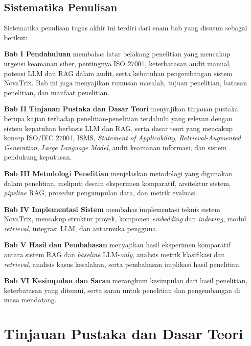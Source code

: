 \documentclass[bachelor,bahasa]{thesisdtetiugm}
\begin{document}
\section{Sistematika Penulisan}
\label{sec:sistematika-penulisan}

Sistematika penulisan tugas akhir ini terdiri dari enam bab yang disusun sebagai berikut:

\textbf{Bab I Pendahuluan} membahas latar belakang penelitian yang mencakup urgensi keamanan siber, pentingnya ISO 27001, keterbatasan audit manual, potensi LLM dan RAG dalam audit, serta kebutuhan pengembangan sistem NovaTrix. Bab ini juga menyajikan rumusan masalah, tujuan penelitian, batasan penelitian, dan manfaat penelitian.

\textbf{Bab II Tinjauan Pustaka dan Dasar Teori} menyajikan tinjauan pustaka berupa kajian terhadap penelitian-penelitian terdahulu yang relevan dengan sistem kepatuhan berbasis LLM dan RAG, serta dasar teori yang mencakup konsep ISO/IEC 27001, ISMS, \textit{Statement of Applicability}, \textit{Retrieval-Augmented Generation}, \textit{Large Language Model}, audit keamanan informasi, dan sistem pendukung keputusan.

\textbf{Bab III Metodologi Penelitian} menjelaskan metodologi yang digunakan dalam penelitian, meliputi desain eksperimen komparatif, arsitektur sistem, \textit{pipeline} RAG, prosedur pengumpulan data, dan metrik evaluasi.

\textbf{Bab IV Implementasi Sistem} membahas implementasi teknis sistem NovaTrix, mencakup struktur proyek, komponen \textit{embedding} dan \textit{indexing}, modul \textit{retrieval}, integrasi LLM, dan antarmuka pengguna.

\textbf{Bab V Hasil dan Pembahasan} menyajikan hasil eksperimen komparatif antara sistem RAG dan \textit{baseline} LLM-\textit{only}, analisis metrik klasifikasi dan \textit{retrieval}, analisis kasus kesalahan, serta pembahasan implikasi hasil penelitian.

\textbf{Bab VI Kesimpulan dan Saran} merangkum kesimpulan dari hasil penelitian, keterbatasan yang ditemui, serta saran untuk penelitian dan pengembangan di masa mendatang.

\cleardoublepage {}
\chapter{Tinjauan Pustaka dan Dasar Teori}
\label{chap:tinjauan-pustaka}
\end{document}
